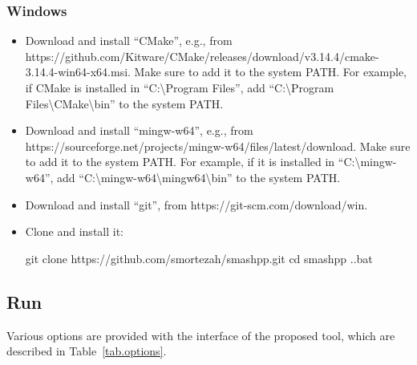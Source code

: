 \subsubsection*{Windows}
\begin{itemize}
  \item Download and install ``CMake'', e.g., from https://github.com/Kitware/CMake/releases/\linebreak download/v3.14.4/cmake-3.14.4-win64-x64.msi. Make sure to add it to the system PATH. For example, if CMake is installed in ``C:\textbackslash Program Files'', add ``C:\textbackslash Program Files\textbackslash CMake\textbackslash bin'' to the system PATH.
  \item Download and install ``mingw-w64'', e.g., from https://sourceforge.net/projects/mingw-w64/\linebreak files/latest/download. Make sure to add it to the system PATH. For example, if it is installed in ``C:\textbackslash mingw-w64'', add ``C:\textbackslash mingw-w64\textbackslash mingw64\textbackslash bin'' to the system PATH.
  \item Download and install ``git'', from https://git-scm.com/download/win.
  \item Clone \smashpp and install it:
\begin{code}[style=bash]
git clone https://github.com/smortezah/smashpp.git
cd smashpp
.\install.bat
\end{code}
\end{itemize}

\subsection{Run \smashpp}
Various options are provided with the interface of the proposed tool, which are described in Table~\ref{tab.options}.

